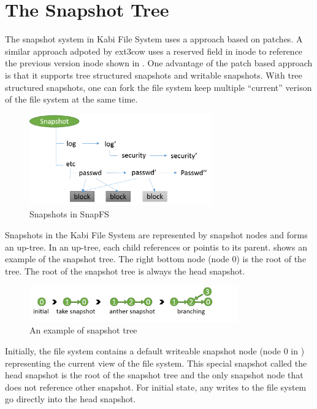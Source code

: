 \section{The Snapshot Tree}

    The snapshot system in Kabi File System uses a approach based on patches. A similar approach adpoted by ext3cow uses a reserved field in inode to reference the previous version inode shown in . One advantage of the patch based approach is that it supports tree structured snapshots and writable snapshots. With tree structured snapshots, one can fork the file system keep multiple ``current'' verison of the file system at the same time.

\begin{figure}[t]
\centering
\includegraphics[width=0.7\textwidth]{Chapter-4/figs/fig24.png}
\caption{Snapshots in SnapFS}
\label{fig:snapfs_approach}
\end{figure}

    Snapshots in the Kabi File System are represented by snapshot nodes and forms an up-tree. In an up-tree, each child references or pointis to its parent.  shows an example of the snapshot tree. The right bottom node (node 0) is the root of the tree. The root of the snapshot tree is always the head snapshot.

\begin{figure}[t]
\centering
\includegraphics[width=0.8\textwidth]{Chapter-4/figs/fig13.png}
\caption{An example of snapshot tree}
\label{fig:snap_tree_example}
\end{figure}

    Initially, the file system contains a default writeable snapshot node (node 0 in ) representing the current view of the file system. This special snapshot called the head snapshot is the root of the snapshot tree and the only snapshot node that does not reference other snapshot. For initial state, any writes to the file system go directly into the head snapshot.
    

